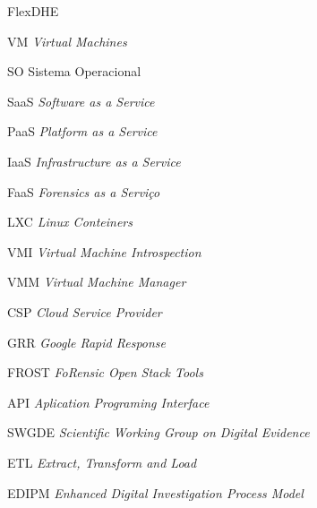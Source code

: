 \documentclass[a4paper,capchap,espacoduplo,normaltoc]{abntepusp-en}
\newcommand{\hash}{\mathcal{H}}
\newcommand{\bigO}{\mathcal{O}}
\begin{document}
\begin{listofabbrv}{FlexDHE}
    \item [VM] \textit{Virtual Machines}
    \item [SO] Sistema Operacional
    \item [SaaS] \textit{Software as a Service}
    \item [PaaS] \textit{Platform as a Service}
    \item [IaaS] \textit{Infrastructure as a Service}
    \item [FaaS] \textit{Forensics as a Serviço}
    \item [LXC] \textit{Linux Conteiners}
    \item [VMI] \textit{Virtual Machine Introspection}
    \item [VMM] \textit{Virtual Machine Manager}
    \item [CSP] \textit{Cloud Service Provider}
    \item [GRR] \textit{Google Rapid Response}
    \item [FROST] \textit{FoRensic Open Stack Tools} 
    \item [API] \textit{Aplication Programing Interface}
    \item [SWGDE] \textit{Scientific Working Group on Digital Evidence}
    \item [ETL] \textit{Extract, Transform and Load}
    \item [EDIPM] \textit{Enhanced Digital Investigation Process Model}
\end{listofabbrv}



\tableofcontents









\appendix

%
\end{document}
